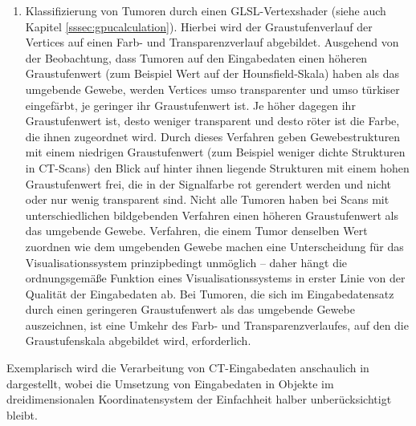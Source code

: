 \documentclass[ngerman,pdftex,paper=A4,DIV=calc,titlepage,12pt]{scrartcl}
\newtheorem[L]{boxedDefinition}{Definition}
\begin{document}
\begin{enumerate}
 \item Klassifizierung von Tumoren durch einen GLSL-Vertexshader (siehe auch Kapitel \vref{sssec:gpucalculation}). Hierbei wird der Graustufenverlauf der Vertices auf einen Farb- und Transparenzverlauf abgebildet. Ausgehend von der Beobachtung, dass Tumoren auf den Eingabedaten einen höheren Graustufenwert (zum Beispiel Wert auf der Hounsfield-Skala) haben als das umgebende Gewebe, werden Vertices umso transparenter und umso türkiser eingefärbt, je geringer ihr Graustufenwert ist. Je höher dagegen ihr Graustufenwert ist, desto weniger transparent und desto röter ist die Farbe, die ihnen zugeordnet wird. Durch dieses Verfahren geben Gewebestrukturen mit einem niedrigen Graustufenwert (zum Beispiel weniger dichte Strukturen in CT-Scans) den Blick auf hinter ihnen liegende Strukturen mit einem hohen Graustufenwert frei, die in der Signalfarbe rot gerendert werden und nicht oder nur wenig transparent sind. Nicht alle Tumoren haben bei Scans mit unterschiedlichen bildgebenden Verfahren einen höheren Graustufenwert als das umgebende Gewebe. Verfahren, die einem Tumor denselben Wert zuordnen wie dem umgebenden Gewebe machen eine Unterscheidung für das Visualisationssystem prinzipbedingt unmöglich -- daher hängt die ordnungsgemäße Funktion eines Visualisationssystems in erster Linie von der Qualität der Eingabedaten ab. Bei Tumoren, die sich im Eingabedatensatz durch einen geringeren Graustufenwert als das umgebende Gewebe auszeichnen, ist eine Umkehr des Farb- und Transparenzverlaufes, auf den die Graustufenskala abgebildet wird, erforderlich.
\end{enumerate}
Exemplarisch wird die Verarbeitung von CT-Eingabedaten anschaulich in  dargestellt, wobei die Umsetzung von Eingabedaten in Objekte im dreidimensionalen Koordinatensystem der Einfachheit halber unberücksichtigt bleibt.
\end{document}
